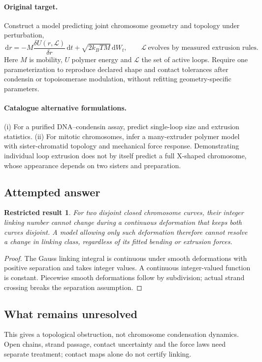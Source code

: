 \documentclass[11pt]{article}
\newcommand{\dd}{\,\mathrm d}
\newtheorem{attemptresult}{Restricted result}[section]
\begin{document}
\paragraph{Original target.}
Construct a model predicting joint chromosome geometry and topology under perturbation,
\[\dd r=-M\frac{\delta U(r,\mathcal L)}{\delta r}\dd t+\sqrt{2k_BT M}\dd W_t,\qquad \mathcal L\ \text{evolves by measured extrusion rules}.\]
Here $M$ is mobility, $U$ polymer energy and $\mathcal L$ the set of active loops. Require one parameterization to reproduce declared shape and contact tolerances after condensin or topoisomerase modulation, without refitting geometry-specific parameters.
\paragraph{Catalogue alternative formulations.}
(i) For a purified DNA--condensin assay, predict single-loop size and extrusion statistics. (ii) For mitotic chromosomes, infer a many-extruder polymer model with sister-chromatid topology and mechanical force response. Demonstrating individual loop extrusion does not by itself predict a full X-shaped chromosome, whose appearance depends on two sisters and preparation.
\subsection{Attempted answer}
\begin{attemptresult}
For two disjoint closed chromosome curves, their integer linking number cannot change during a continuous deformation that keeps both curves disjoint. A model allowing only such deformation therefore cannot resolve a change in linking class, regardless of its fitted bending or extrusion forces.
\end{attemptresult}
\begin{proof}
The Gauss linking integral is continuous under smooth deformations with positive separation and takes integer values. A continuous integer-valued function is constant. Piecewise smooth deformations follow by subdivision; actual strand crossing breaks the separation assumption.
\end{proof}
\subsection{What remains unresolved}
This gives a topological obstruction, not chromosome condensation dynamics. Open chains, strand passage, contact uncertainty and the force laws need separate treatment; contact maps alone do not certify linking.
\end{document}
